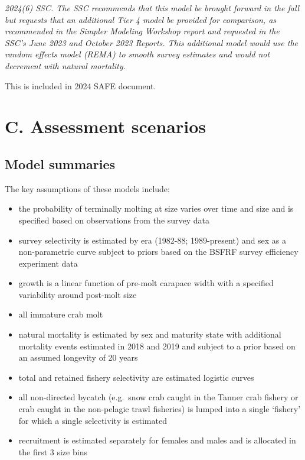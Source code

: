 \documentclass[
]{article}
\begin{document}
\emph{2024(6) SSC. The SSC recommends that this model be brought forward in the fall but requests that an additional Tier 4 model be provided for comparison, as recommended in the Simpler Modeling Workshop report and requested in the SSC's June 2023 and October 2023 Reports. This additional model would use the random effects model (REMA) to smooth survey estimates and would not decrement with natural mortality.}

This is included in 2024 SAFE document.

\newpage

\section{C. Assessment scenarios}\label{c.-assessment-scenarios}

\subsection{Model summaries}\label{model-summaries}

The key assumptions of these models include:

\begin{itemize}
\item
  the probability of terminally molting at size varies over time and size and is specified based on observations from the survey data
\item
  survey selectivity is estimated by era (1982-88; 1989-present) and sex as a non-parametric curve subject to priors based on the BSFRF survey efficiency experiment data
\item
  growth is a linear function of pre-molt carapace width with a specified variability around post-molt size
\item
  all immature crab molt
\item
  natural mortality is estimated by sex and maturity state with additional mortality events estimated in 2018 and 2019 and subject to a prior based on an assumed longevity of 20 years
\item
  total and retained fishery selectivity are estimated logistic curves
\item
  all non-directed bycatch (e.g.~snow crab caught in the Tanner crab fishery or crab caught in the non-pelagic trawl fisheries) is lumped into a single `fishery' for which a single selectivity is estimated
\item
  recruitment is estimated separately for females and males and is allocated in the first 3 size bins
\end{itemize}
\end{document}
